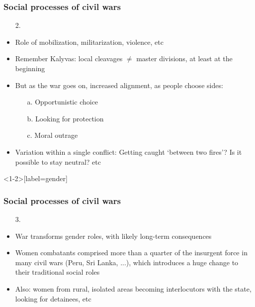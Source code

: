 \documentclass[aspectratio=43]{beamer}
\begin{document}


\begin{frame}
\frametitle{Social processes of civil wars}
\centering

\begin{itemize}[<+->]
  \item[2.] {\color{red}{Polarization of identities}}
  \item Role of mobilization, militarization, violence, etc
  \item Remember Kalyvas: local cleavages $\neq$ master divisions, at least at the beginning
  \item But as the war goes on, increased alignment, as people choose sides:
  \begin{itemize}
    \item[a.] Opportunistic choice
    \item[b.] Looking for protection
    \item[c.] Moral outrage
  \end{itemize}
  \item Variation within a single conflict: Getting caught `between two fires'? Is it possible to stay neutral? etc
\end{itemize}

\end{frame}

\begin{frame}<1-2>[label=gender]
\frametitle{Social processes of civil wars}
\centering

\begin{itemize}[<+->]
  \item[3.] {\color{red}{Gender roles}}
  \item War transforms gender roles, with likely long-term consequences
  \item Women combatants comprised more than a quarter of the insurgent force in many civil wars (Peru, Sri Lanka, ...), which introduces a huge change to their traditional social roles
  \item Also: women from rural, isolated areas becoming interlocutors with the state, looking for detainees, etc
\end{itemize}

\end{frame}
\end{document}
